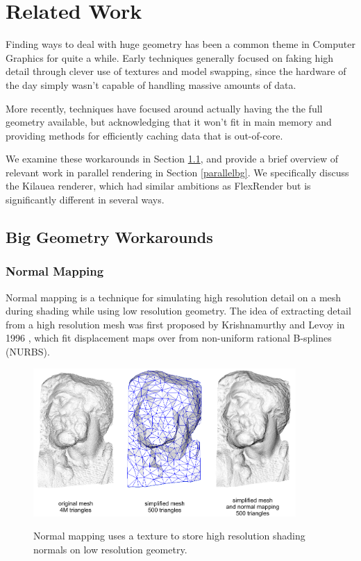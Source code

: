\documentclass[12pt]{ucthesis}
\newcommand{\captionfonts}{\small\bf\ssp}
\begin{document}
\chapter{Related Work}
\label{relatedwork}

Finding ways to deal with huge geometry has been a common theme in Computer
Graphics for quite a while. Early techniques generally focused on faking
high detail through clever use of textures and model swapping, since the
hardware of the day simply wasn't capable of handling massive amounts of data.

More recently, techniques have focused around actually having the the full
geometry available, but acknowledging that it won't fit in main memory and
providing methods for efficiently caching data that is out-of-core.

We examine these workarounds in Section \ref{workarounds}, and provide a brief
overview of relevant work in parallel rendering in Section \ref{parallelbg}.
We specifically discuss the Kilauea renderer, which had similar ambitions as
FlexRender but is significantly different in several ways.

\section{Big Geometry Workarounds}
\label{workarounds}

\subsection{Normal Mapping}
\label{normalmaps}

Normal mapping is a technique for simulating high resolution detail on a mesh
during shading while using low resolution geometry. The idea of extracting
detail from a high resolution mesh was first proposed by Krishnamurthy and
Levoy in 1996 \cite{krishnamurthy:1996}, which fit displacement maps over
from non-uniform rational B-splines (NURBS).

\begin{figure}[h!]
    \centering
    \includegraphics[width=100mm]{images/normalmapping.png}
    \captionfonts
    \caption{Normal mapping uses a texture to store high resolution shading normals on low resolution geometry.}
    \label{fig:netarch}
\end{figure}
\end{document}
